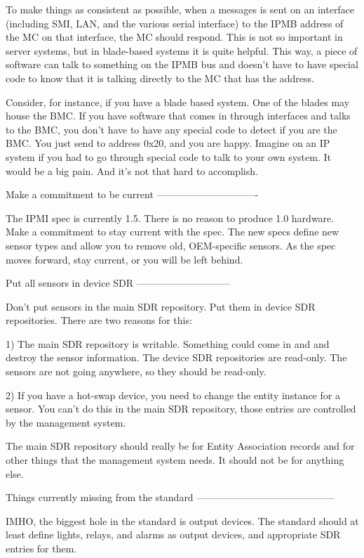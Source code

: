 To make things as consistent as possible, when a messages is sent on
an interface (including SMI, LAN, and the various serial interface) to
the IPMB address of the MC on that interface, the MC should respond.
This is not so important in server systems, but in blade-based systems
it is quite helpful.  This way, a piece of software can talk to
something on the IPMB bus and doesn't have to have special code to
know that it is talking directly to the MC that has the address.

Consider, for instance, if you have a blade based system.  One of the
blades may house the BMC.  If you have software that comes in through
interfaces and talks to the BMC, you don't have to have any special
code to detect if you are the BMC.  You just send to address 0x20, and
you are happy.  Imagine on an IP system if you had to go through
special code to talk to your own system.  It would be a big pain.  And
it's not that hard to accomplish.


Make a commitment to be current
-------------------------------

The IPMI spec is currently 1.5.  There is no reason to produce 1.0
hardware.  Make a commitment to stay current with the spec.  The new
specs define new sensor types and allow you to remove old,
OEM-specific sensors.  As the spec moves forward, stay current, or you
will be left behind.


Put all sensors in device SDR
-----------------------------

Don't put sensors in the main SDR repository.  Put them in device SDR
repositories.  There are two reasons for this:

1) The main SDR repository is writable.  Something could come in and
   and destroy the sensor information.  The device SDR repositories
   are read-only.  The sensors are not going anywhere, so they should
   be read-only.

2) If you have a hot-swap device, you need to change the entity
   instance for a sensor.  You can't do this in the main SDR
   repository, those entries are controlled by the management system.

The main SDR repository should really be for Entity Association
records and for other things that the management system needs.  It
should not be for anything else.


Things currently missing from the standard
------------------------------------------

IMHO, the biggest hole in the standard is output devices.  The
standard should at least define lights, relays, and alarms as output
devices, and appropriate SDR entries for them.

